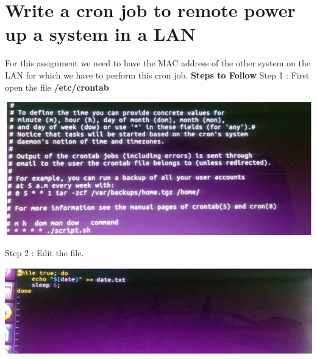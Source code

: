 \documentclass{article}
\begin{document}
\section{Write a cron job to remote power up a system in a LAN}
For this assignment we need to have the MAC address of the other system on the LAN for which we have to perform this cron job.
\newline
\newline
\textbf{Steps to Follow}
\newline
Step 1 : First open the file \textbf{/etc/crontab}\newline
\begin{center}
    \includegraphics[scale=1]{cron1.PNG}
\end{center}
Step 2 : Edit the file.\newline
\begin{center}
    \includegraphics[scale=1]{cron2.PNG}
\end{center}
\newpage
\end{document}
